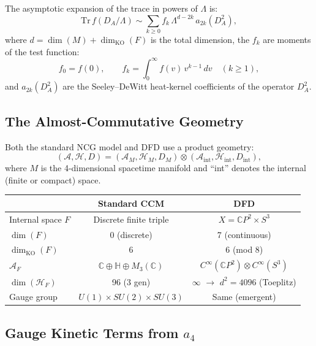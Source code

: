 \documentclass[12pt,a4paper]{article}
\begin{document}
The asymptotic expansion of the trace in powers of $\Lambda$ is:
\begin{equation}\label{eq:heat-expansion}
\mathrm{Tr}\,f(D_A/\Lambda) \sim
\sum_{k \geq 0} f_k\,\Lambda^{d-2k}\,a_{2k}(D_A^2),
\end{equation}
where $d = \dim(M) + \dim_{\mathrm{KO}}(F)$ is the total dimension, the
$f_k$ are moments of the test function:
\begin{equation}
f_0 = f(0), \qquad f_k = \int_0^\infty f(v)\,v^{k-1}\,dv \quad (k \geq 1),
\end{equation}
and $a_{2k}(D_A^2)$ are the Seeley--DeWitt heat-kernel coefficients of the
operator $D_A^2$.

\subsection{The Almost-Commutative Geometry}

Both the standard NCG model and DFD use a product geometry:
\begin{equation}
(\mathcal{A}, \mathcal{H}, D) =
(\mathcal{A}_M, \mathcal{H}_M, D_M) \otimes
(\mathcal{A}_{\mathrm{int}}, \mathcal{H}_{\mathrm{int}}, D_{\mathrm{int}}),
\end{equation}
where $M$ is the 4-dimensional spacetime manifold and ``int'' denotes the
internal (finite or compact) space.

\begin{center}
\renewcommand{\arraystretch}{1.3}
\begin{tabular}{lcc}
\toprule
& \textbf{Standard CCM} & \textbf{DFD} \\
\midrule
Internal space $F$ & Discrete finite triple & $X = \mathbb{C}P^2 \times S^3$ \\
$\dim(F)$ & 0 (discrete) & 7 (continuous) \\
$\dim_{\mathrm{KO}}(F)$ & 6 & 6 (mod 8) \\
$\mathcal{A}_F$ & $\mathbb{C} \oplus \mathbb{H} \oplus M_3(\mathbb{C})$
  & $C^\infty(\mathbb{C}P^2) \otimes C^\infty(S^3)$ \\
$\dim(\mathcal{H}_F)$ & 96 (3 gen) & $\infty$ $\to$ $d^2 = 4096$ (Toeplitz) \\
Gauge group & $U(1) \times SU(2) \times SU(3)$ & Same (emergent) \\
\bottomrule
\end{tabular}
\end{center}

\subsection{Gauge Kinetic Terms from $a_4$}
\label{sec:gauge-from-a4}
\end{document}
